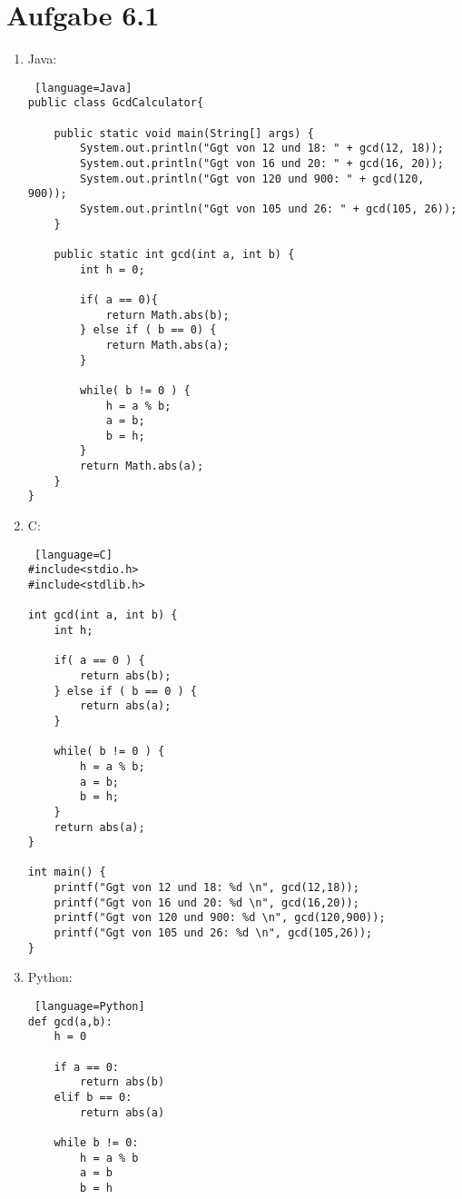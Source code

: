 \documentclass[a4paper,11pt]{scrartcl}
\renewcommand{\labelenumi}{(\roman{enumi})}
\begin{document}
    \section*{Aufgabe 6.1}
    \renewcommand{\labelenumi}{\alph{enumi})}
		\begin{enumerate}
            \item Java:
\begin{lstlisting} [language=Java]
public class GcdCalculator{

    public static void main(String[] args) {
        System.out.println("Ggt von 12 und 18: " + gcd(12, 18));
        System.out.println("Ggt von 16 und 20: " + gcd(16, 20));
        System.out.println("Ggt von 120 und 900: " + gcd(120, 900));
        System.out.println("Ggt von 105 und 26: " + gcd(105, 26));
    }

    public static int gcd(int a, int b) {
        int h = 0; 

        if( a == 0){
            return Math.abs(b);
        } else if ( b == 0) {
            return Math.abs(a);
        }

        while( b != 0 ) {
            h = a % b;
            a = b;
            b = h;
        }
        return Math.abs(a);
    }
}
\end{lstlisting}
            \item C:
\begin{lstlisting} [language=C]
#include<stdio.h>
#include<stdlib.h>

int gcd(int a, int b) {
    int h;

    if( a == 0 ) {
        return abs(b);
    } else if ( b == 0 ) {
        return abs(a);
    }

    while( b != 0 ) {
        h = a % b;
        a = b;
        b = h;
    }
    return abs(a);
}

int main() {
    printf("Ggt von 12 und 18: %d \n", gcd(12,18));
    printf("Ggt von 16 und 20: %d \n", gcd(16,20));
    printf("Ggt von 120 und 900: %d \n", gcd(120,900));
    printf("Ggt von 105 und 26: %d \n", gcd(105,26));
}
\end{lstlisting}
\newpage
            \item Python:
\begin{lstlisting} [language=Python]
def gcd(a,b):
    h = 0

    if a == 0:
        return abs(b)
    elif b == 0:
        return abs(a)

    while b != 0:
        h = a % b
        a = b
        b = h


\end{lstlisting}
\end{enumerate}
\end{document}
